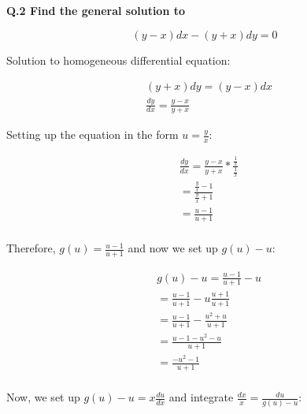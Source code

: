 \documentclass{article}
\begin{document}
    \newpage
    \begin{singlespace}
        \begin{flushleft}
            \textbf{Q.2 Find the general solution to}
        \end{flushleft}
        \begin{center}
            \begin{equation}
                \left( y-x \right)dx - \left( y +x \right)dy = 0
            \end{equation}
        \end{center}
        \begin{flushleft}
            Solution to homogeneous differential equation:
        \end{flushleft}
        \begin{align*}
            &\left( y +x \right)dy = \left( y-x \right)dx  \\
            &\frac{dy}{dx} = \frac{y-x}{y+x}
        \end{align*}
        \begin{flushleft}
            Setting up the equation in the form $u=\frac{y}{x}$:
        \end{flushleft}
        \begin{align*}
            &\frac{dy}{dx} = \frac{y-x}{y+x} * \frac{\frac{1}{x}}{\frac{1}{x}} \\
            &= \frac{\frac{y}{x}-1}{\frac{y}{x}+1} \\
            &= \frac{u-1}{u+1} \\
        \end{align*}
        \begin{flushleft}
            Therefore, $g(u)=\frac{u-1}{u+1}$ and now we set up $g(u)-u$:
        \end{flushleft}
        \begin{align*}
            &g(u)-u = \frac{u-1}{u+1} - u \\
            &= \frac{u-1}{u+1} - u\frac{u+1}{u+1} \\
            &= \frac{u-1}{u+1} - \frac{u^{2}+u}{u+1} \\
            &= \frac{u-1-u^{2}-u}{u+1} \\
            &= \frac{-u^{2}-1}{u+1} \\
        \end{align*}
        \begin{flushleft}
            Now, we set up $g(u)-u=x\frac{du}{dx}$ and integrate $\frac{dx}{x}=\frac{du}{g(u)-u}$:

\end{flushleft}
\end{singlespace}
\end{document}
